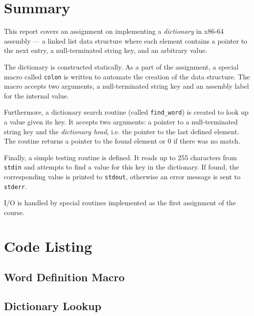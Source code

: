\documentclass[en, listings]{labreport}
\begin{document}
\maketitlepage

\section*{Summary}

This report covers an assignment on implementing a \textit{dictionary} in
x86-64 assembly — a linked list data structure where each element contains
a pointer to the next entry, a null-terminated string key, and an arbitrary value.

The dictionary is constructed statically. As a part of the assignment,
a special macro called \texttt{colon} is written to automate
the creation of the data structure. The macro accepts two arguments,
a null-terminated string key and an assembly label for the internal value.

Furthermore, a dictionary search routine (called \texttt{find\_word}) is created
to look up a value given its key. It accepts two arguments: a pointer to
a null-terminated string key and the \textit{dictionary head}, i.e. the pointer
to the last defined element. The routine returns a pointer to the found element
or 0 if there was no match.

Finally, a simple testing routine is defined. It reads up to 255 characters
from \texttt{stdin} and attempts to find a value for this key in the dictionary.
If found, the corresponding value is printed to \texttt{stdout}, otherwise
an error message is sent to \texttt{stderr}.

I/O is handled by special routines implemented as the first assignment
of the course.

\section*{Code Listing}

\subsection*{Word Definition Macro}



\subsection*{Dictionary Lookup}


\end{document}
